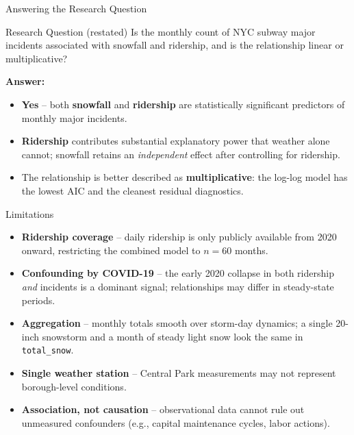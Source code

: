 \documentclass[aspectratio=43]{beamer}
\begin{document}
\begin{frame}{Answering the Research Question}
\begin{block}{Research Question (restated)}
Is the monthly count of NYC subway major incidents associated with snowfall and ridership, and is the relationship linear or multiplicative?
\end{block}

\vspace{0.2cm}
\textbf{Answer:}
\begin{itemize}
  \item \textbf{Yes} -- both \textbf{snowfall} and \textbf{ridership} are statistically significant predictors of monthly major incidents.
  \item \textbf{Ridership} contributes substantial explanatory power that weather alone cannot; snowfall retains an \emph{independent} effect after controlling for ridership.
  \item The relationship is better described as \textbf{multiplicative}: the log-log model has the lowest AIC and the cleanest residual diagnostics.
\end{itemize}
\end{frame}

\begin{frame}{Limitations}
\begin{itemize}
  \item \textbf{Ridership coverage} -- daily ridership is only publicly available from 2020 onward, restricting the combined model to $n=60$ months.
  \item \textbf{Confounding by COVID-19} -- the early 2020 collapse in both ridership \emph{and} incidents is a dominant signal; relationships may differ in steady-state periods.
  \item \textbf{Aggregation} -- monthly totals smooth over storm-day dynamics; a single 20-inch snowstorm and a month of steady light snow look the same in \texttt{total\_snow}.
  \item \textbf{Single weather station} -- Central Park measurements may not represent borough-level conditions.
  \item \textbf{Association, not causation} -- observational data cannot rule out unmeasured confounders (e.g., capital maintenance cycles, labor actions).
\end{itemize}
\end{frame}
\end{document}
